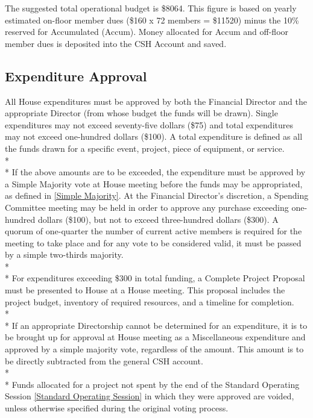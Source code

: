 \documentclass{article}
\newcommand{\bsection}[1]{\subsection{#1} \label{#1}}
\begin{document}
The suggested total operational budget is \$8064.
This figure is based on yearly estimated on-floor member dues (\$160 x 72 members = \$11520) minus the 10\% reserved for Accumulated (Accum).
Money allocated for Accum and off-floor member dues is deposited into the CSH Account and saved.

\bsection{Expenditure Approval}
All House expenditures must be approved by both the Financial Director and the appropriate Director (from whose budget the funds will be drawn).
Single expenditures may not exceed seventy-five dollars (\$75) and total expenditures may not exceed one-hundred dollars (\$100).
A total expenditure is defined as all the funds drawn for a specific event, project, piece of equipment, or service.
\\* \\*
If the above amounts are to be exceeded, the expenditure must be approved by a Simple Majority vote at House meeting before the funds may be appropriated, as defined in \ref{Simple Majority}.
At the Financial Director's discretion, a Spending Committee meeting may be held in order to approve any purchase exceeding one-hundred dollars (\$100), but not to exceed three-hundred dollars (\$300).
A quorum of one-quarter the number of current active members is required for the meeting to take place and for any vote to be considered valid, it must be passed by a simple two-thirds majority.
\\*\\*
For expenditures exceeding \$300 in total funding, a Complete Project Proposal must be presented to House at a House meeting.
This proposal includes the project budget, inventory of required resources, and a timeline for completion.
\\* \\*
If an appropriate Directorship cannot be determined for an expenditure, it is to be brought up for approval at House meeting as a Miscellaneous expenditure and approved by a simple majority vote, regardless of the amount.
This amount is to be directly subtracted from the general CSH account.
\\* \\*
Funds allocated for a project not spent by the end of the Standard Operating Session \ref{Standard Operating Session} in which they were approved are voided, unless otherwise specified during the original voting process.
\end{document}
